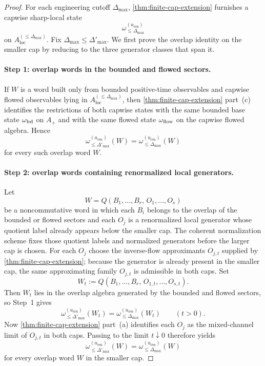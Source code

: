 \begin{proof}
For each engineering cutoff $\Delta_{\max}$, \cref{thm:finite-cap-extension} furnishes a capwise sharp-local state
\[
\omega_{\le \Delta_{\max}}^{(u_{\mathrm{ren}})}
\]
on $A_{\mathrm{loc}}^{(\le \Delta_{\max})}$. Fix $\Delta_{\max}\le \Delta'_{\max}$. We first prove the overlap identity on the smaller cap by reducing to the three generator classes that span it.

\paragraph*{Step 1: overlap words in the bounded and flowed sectors.}
If $W$ is a word built only from bounded positive-time observables and capwise flowed observables lying in $A_{\mathrm{loc}}^{(\le \Delta_{\max})}$, then \cref{thm:finite-cap-extension} part~\textup{(c)} identifies the restrictions of both capwise states with the same bounded base state $\omega_{\mathrm{bd}}$ on $A_+$ and with the same flowed state $\omega_{\mathrm{flow}}$ on the capwise flowed algebra. Hence
\[
\omega_{\le \Delta'_{\max}}^{(u_{\mathrm{ren}})}(W)=\omega_{\le \Delta_{\max}}^{(u_{\mathrm{ren}})}(W)
\]
for every such overlap word $W$.

\paragraph*{Step 2: overlap words containing renormalized local generators.}
Let
\[
W=Q(B_1,\dots,B_r,\,O_1,\dots,O_s)
\]
be a noncommutative word in which each $B_i$ belongs to the overlap of the bounded or flowed sectors and each $O_j$ is a renormalized local generator whose quotient label already appears below the smaller cap. The coherent normalization scheme fixes those quotient labels and normalized generators before the larger cap is chosen. For each $O_j$ choose the inverse-flow approximants $O_{j,t}$ supplied by \cref{thm:finite-cap-extension}; because the generator is already present in the smaller cap, the same approximating family $O_{j,t}$ is admissible in both caps. Set
\[
W_t:=Q(B_1,\dots,B_r,\,O_{1,t},\dots,O_{s,t}).
\]
Then $W_t$ lies in the overlap algebra generated by the bounded and flowed sectors, so Step~1 gives
\[
\omega_{\le \Delta'_{\max}}^{(u_{\mathrm{ren}})}(W_t)=\omega_{\le \Delta_{\max}}^{(u_{\mathrm{ren}})}(W_t)
\qquad (t>0).
\]
Now \cref{thm:finite-cap-extension} part~\textup{(a)} identifies each $O_j$ as the mixed-channel limit of $O_{j,t}$ in both caps. Passing to the limit $t\downarrow 0$ therefore yields
\[
\omega_{\le \Delta'_{\max}}^{(u_{\mathrm{ren}})}(W)=\omega_{\le \Delta_{\max}}^{(u_{\mathrm{ren}})}(W)
\]
for every overlap word $W$ in the smaller cap.


\end{proof}
